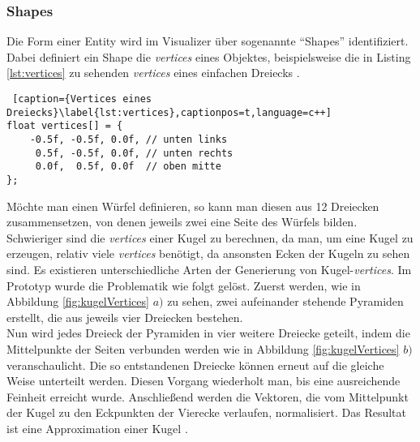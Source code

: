 \documentclass[11pt,a4paper]{article}
\begin{document}
\subsubsection{Shapes}
Die Form einer Entity wird im Visualizer über sogenannte ``Shapes'' identifiziert. Dabei definiert ein Shape die \mbox{\textit{vertices}} eines Objektes, beispielsweise die in Listing \ref{lst:vertices} zu sehenden \mbox{\textit{vertices}} eines einfachen Dreiecks \cite[Hello Triangle]{LearnOpenGL}.

\begin{lstlisting} [caption={Vertices eines Dreiecks}\label{lst:vertices},captionpos=t,language=c++]
float vertices[] = {
    -0.5f, -0.5f, 0.0f, // unten links
     0.5f, -0.5f, 0.0f, // unten rechts
     0.0f,  0.5f, 0.0f  // oben mitte
};
\end{lstlisting}
\noindent
Möchte man einen Würfel definieren, so kann man diesen aus 12 Dreiecken zusammensetzen, von denen jeweils zwei eine Seite des Würfels bilden.\\
Schwieriger sind die  \mbox{\textit{vertices}} einer Kugel zu berechnen, da man, um eine Kugel zu erzeugen, relativ viele  \mbox{\textit{vertices}} benötigt, da ansonsten Ecken der Kugeln zu sehen sind. Es existieren unterschiedliche Arten der Generierung von Kugel-\mbox{\textit{vertices}}. Im Prototyp wurde die Problematik wie folgt gelöst. Zuerst werden, wie in Abbildung \ref{fig:kugelVertices} $a)$ zu sehen, zwei aufeinander stehende Pyramiden erstellt, die aus jeweils vier Dreiecken bestehen.\\
Nun wird jedes Dreieck der Pyramiden in vier weitere Dreiecke geteilt, indem die Mittelpunkte der Seiten verbunden werden wie in Abbildung \ref{fig:kugelVertices} $b)$ veranschaulicht. Die so entstandenen Dreiecke können erneut auf die gleiche Weise unterteilt werden. Diesen Vorgang wiederholt man, bis eine ausreichende Feinheit erreicht wurde. Anschließend werden die Vektoren, die vom Mittelpunkt der Kugel zu den Eckpunkten der Vierecke verlaufen, normalisiert. Das Resultat ist eine Approximation einer Kugel \cite{sphereGeneration}.
\end{document}
